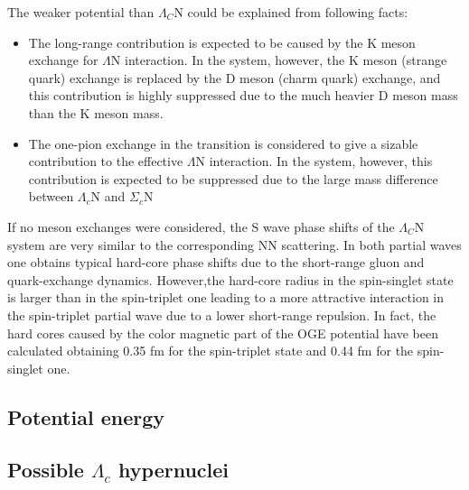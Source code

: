 \documentclass[12pt,a4paper]{book}
\begin{document}
	The weaker potential than $\Lambda_C$N could be explained from following facts: 
	\begin{itemize}
		\item The long-range contribution is expected to be caused by the K meson exchange for $\Lambda$N interaction. In the system, however, the K meson (strange quark) exchange is replaced by the D meson (charm quark) exchange, and this contribution is highly suppressed due to the much heavier D meson mass than the K meson mass.
		\item The one-pion exchange in the transition is considered to give a sizable contribution to the effective $\Lambda$N interaction. In the system, however, this contribution is expected to be suppressed due to the large mass difference between $\Lambda_c$N and $\Sigma_c$N 
		
	\end{itemize}  
	If no meson exchanges were considered, the S wave phase shifts of the $\Lambda_C$N system are very similar to the corresponding NN scattering. In both partial waves one obtains typical	hard-core phase shifts due to the short-range gluon and quark-exchange dynamics. However,the hard-core radius in the spin-singlet state is larger than in the spin-triplet one leading	to a more attractive interaction in the spin-triplet partial wave due to a lower short-range repulsion. In fact, the hard cores caused by the color magnetic part of the OGE potential have been calculated obtaining 0.35 fm for the spin-triplet state and 0.44 fm	for the spin-singlet one.
	
	\subsection{Potential energy}
		
	
	
	\subsection{Possible $\Lambda_c$ hypernuclei}
	
\end{document}
